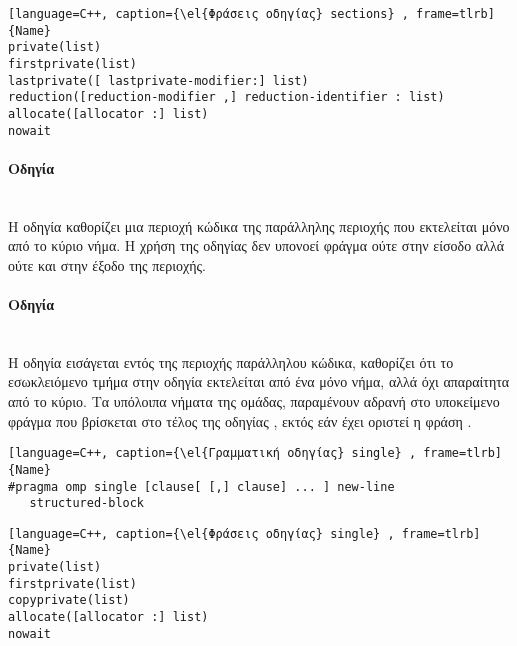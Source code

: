 \begin{spacing}{1.3}
\begin{lstlisting}[language=C++, caption={\el{Φράσεις οδηγίας} sections} , frame=tlrb]{Name}
private(list) 
firstprivate(list) 
lastprivate([ lastprivate-modifier:] list) 
reduction([reduction-modifier ,] reduction-identifier : list) 
allocate([allocator :] list) 
nowait
\end{lstlisting}
\end{spacing}

\paragraph{Οδηγία \emph{}}
\ \\
Η οδηγία \emph{} καθορίζει μια περιοχή κώδικα της παράλληλης περιοχής που εκτελείται μόνο από το κύριο νήμα.
Η χρήση της οδηγίας δεν υπονοεί φράγμα ούτε στην είσοδο αλλά ούτε και στην έξοδο της περιοχής\cite{ibm_master}.

\clearpage
\paragraph{Οδηγία \emph{}}
\ \\
Η οδηγία \textbf{} εισάγεται εντός της περιοχής παράλληλου κώδικα, καθορίζει
ότι το εσωκλειόμενο τμήμα στην οδηγία εκτελείται από ένα μόνο νήμα, αλλά όχι απαραίτητα από το κύριο. Τα υπόλοιπα
νήματα της ομάδας, παραμένουν αδρανή στο υποκείμενο φράγμα που βρίσκεται στο τέλος της οδηγίας \emph{},
εκτός εάν έχει οριστεί η φράση \emph{}\cite{openmpse16}.

\begin{spacing}{1.1}
\begin{lstlisting}[language=C++, caption={\el{Γραμματική οδηγίας} single} , frame=tlrb]{Name} 
#pragma omp single [clause[ [,] clause] ... ] new-line 
   structured-block
\end{lstlisting}
\end{spacing}

\begin{spacing}{1.1}
\begin{lstlisting}[language=C++, caption={\el{Φράσεις οδηγίας} single} , frame=tlrb]{Name}
private(list) 
firstprivate(list) 
copyprivate(list) 
allocate([allocator :] list) 
nowait
\end{lstlisting}
\end{spacing}

